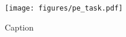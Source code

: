 
\begin{figure}
    \centering
    \texttt{[image: figures/pe\_task.pdf]}
    \caption{Caption}
    \label{fig:my_label}
\end{figure}

